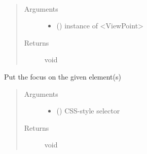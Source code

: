 \documentclass[a4paper,12pt,english]{sphinxmanual}
\begin{document}
\begin{fulllineitems}
\label{\detokenize{viewer/parameters:BIMDataViewer.setViewPoint}}~\begin{quote}\begin{description}
\item[{Arguments}] \leavevmode\begin{itemize}
\item {} 
 () \textendash{} instance of \textless{}ViewPoint\textgreater{}

\end{itemize}

\item[{Returns}] \leavevmode
void

\end{description}\end{quote}

\end{fulllineitems}



\begin{fulllineitems}
\label{\detokenize{viewer/parameters:BIMDataViewer.viewFit}}
Put the focus on the given element(s)
\begin{quote}\begin{description}
\item[{Arguments}] \leavevmode\begin{itemize}
\item {} 
 () \textendash{} CSS-style selector

\end{itemize}

\item[{Returns}] \leavevmode
void

\end{description}\end{quote}

\end{fulllineitems}
\end{document}
